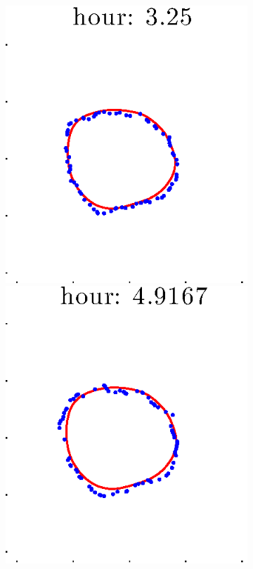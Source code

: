 \documentclass[12pt]{article}
\begin{document}
\begin{figure}[h!]
\begin{subfigure}[b]{.3\textwidth}
		\includegraphics[height=.15\textheight]{Pos5exp2/full/first3.eps}
		\includegraphics[height=.15\textheight]{Pos5exp2/full/first4.eps}

\end{subfigure}
\end{figure}
\end{document}
